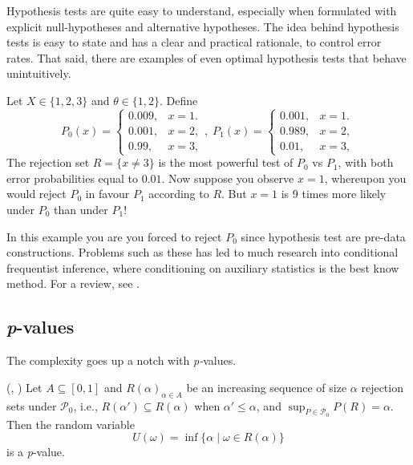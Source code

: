 Hypothesis tests are quite easy to understand, especially when formulated with explicit null-hypotheses and alternative hypotheses. The idea behind hypothesis tests is easy to state and has a clear and practical rationale,  to control error rates. That said, there are examples of even optimal hypothesis tests that behave unintuitively. 

\begin{example}
 Let $X\in\{1,2,3\}$ and $\theta\in\{1,2\}$. Define
\[
P_{0}(x)=\begin{cases}
0.009, & x=1.\\
0.001, & x=2,\\
0.99, & x=3,
\end{cases},\;P_{1}(x)=\begin{cases}
0.001, & x=1.\\
0.989, & x=2,\\
0.01, & x=3,
\end{cases}
\]
The rejection set $R=\{x\neq3\}$ is the most powerful test of $P_{0}$ vs $P_{1}$, with both error probabilities equal to $0.01$. Now suppose you observe $x=1$, whereupon you would reject $P_{0}$ in favour $P_{1}$ according to $R$. But $x=1$ is $9$ times more likely under $P_{0}$ than under $P_{1}$!
\end{example}

In this example you are you forced to reject $P_0$ since hypothesis test are pre-data constructions. Problems such as these has led to much research into conditional frequentist inference, where conditioning on auxiliary statistics is the best know method. For a review, see \textcite{Goutis1995-ga}.

\subsection{\textit{p}-values}
The complexity goes up a notch with \emph{p-}values.
\begin{definition}
\label{def:p-value}(\textcite[][Chapter 3.3]{Lehmann2005-sp}, \textcite{Bayarri2000-dt}) Let
$A\subseteq[0,1]$ and $R(\alpha)_{\alpha \in A}$ be an increasing sequence of size
$\alpha$ rejection sets under $\mathcal{P}_{0}$, i.e., $R(\alpha')\subseteq R(\alpha)$
when $\alpha'\leq\alpha$, and $\sup_{P\in\mathcal{P}_{0}}P(R)=\alpha$.
Then the random variable
\begin{equation}
U(\omega)=\inf\{\alpha\mid\omega\in R(\alpha)\}\label{eq:size p-value}
\end{equation}
is a \textit{p}-value. 
\end{definition}

